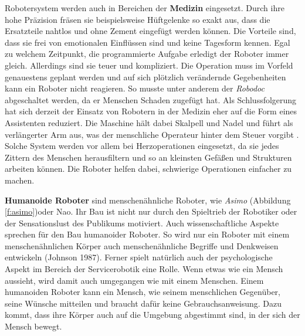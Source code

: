 Robotersystem werden auch in Bereichen der \textbf{Medizin} eingesetzt. Durch ihre hohe Präzision fräsen sie beispielsweise Hüftgelenke so exakt aus, dass die Ersatzteile nahtlos und ohne Zement eingefügt werden können. Die Vorteile sind, dass sie frei von emotionalen Einflüssen sind und keine Tagesform kennen. Egal zu welchem Zeitpunkt, die programmierte Aufgabe erledigt der Roboter immer gleich. Allerdings sind sie teuer und kompliziert. Die Operation muss im Vorfeld genauestens geplant werden und auf sich plötzlich verändernde Gegebenheiten kann ein Roboter nicht reagieren. So musste unter anderem der \textit{Robodoc} abgeschaltet werden, da er Menschen Schaden zugefügt hat. Als Schlussfolgerung hat sich derzeit der Einsatz von Robotern in der Medizin eher auf die Form eines Assistenten reduziert. Die Maschine hält dabei Skalpell und Nadel und führt als verlängerter Arm aus, was der menschliche Operateur hinter dem Steuer vorgibt \cite{Haun2007}. Solche System werden vor allem bei Herzoperationen eingesetzt, da sie jedes Zittern des Menschen herausfiltern und so an kleinsten Gefäßen und Strukturen arbeiten können. Die Roboter helfen dabei, schwierige Operationen einfacher zu machen.

\textbf{Humanoide Roboter} sind menschenähnliche Roboter, wie \textit{Asimo} (Abbildung \ref{f:asimo})oder Nao. Ihr Bau ist nicht nur durch den Spieltrieb der Robotiker oder der Sensationslust des Publikums motiviert. Auch wissenschaftliche Aspekte sprechen für den Bau humanoider Roboter. So wird nur ein Roboter mit einem menschenähnlichen Körper auch menschenähnliche Begriffe und Denkweisen entwickeln (Johnson 1987). Ferner spielt natürlich auch der psychologische Aspekt im Bereich der Servicerobotik eine Rolle. Wenn etwas wie ein Mensch aussieht, wird damit auch umgegangen wie mit einem Menschen. Einem humanoiden Roboter kann ein Mensch, wie seinem menschlichen Gegenüber, seine Wünsche mitteilen und braucht dafür keine Gebrauchsanweisung. Dazu kommt, dass ihre Körper auch auf die Umgebung abgestimmt sind, in der sich der Mensch bewegt.


